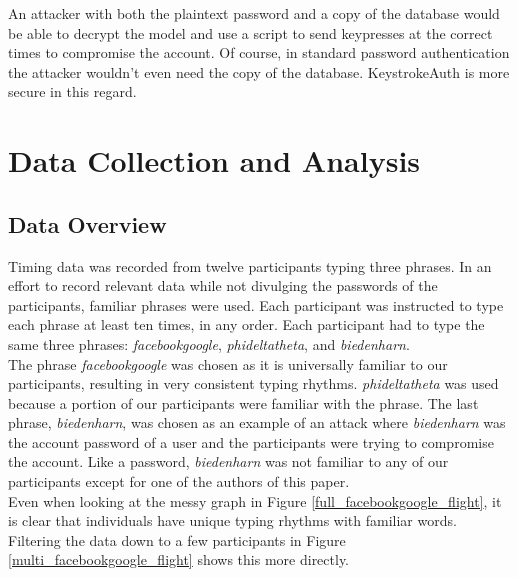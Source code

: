 \documentclass{article}
\begin{document}
An attacker with both the plaintext password and a copy of the database would be able to decrypt the model and use a script to send keypresses at the correct times to compromise the account. 
Of course, in standard password authentication the attacker wouldn't even need the copy of the database. KeystrokeAuth is more secure in this regard.



\section{Data Collection and Analysis}

\subsection{Data Overview}
Timing data was recorded from twelve participants typing three phrases. In an effort to record relevant data while not divulging the passwords of the participants, familiar phrases were used. Each participant was instructed to type each phrase at least ten times, in any order. Each participant had to type the same three phrases: \textit{facebookgoogle}, \textit{phideltatheta}, and \textit{biedenharn}.\\

The phrase \textit{facebookgoogle} was chosen as it is universally familiar to our participants, resulting in very consistent typing rhythms. \textit{phideltatheta} was used because a portion of our participants were familiar with the phrase. The last phrase, \textit{biedenharn}, was chosen as an example of an attack where \textit{biedenharn} was the account password of a user and the participants were trying to compromise the account. Like a password, \textit{biedenharn} was not familiar to any of our participants except for one of the authors of this paper.\\

Even when looking at the messy graph in Figure \ref{full_facebookgoogle_flight}, it is clear that individuals have unique typing rhythms with familiar words. Filtering the data down to a few participants in Figure \ref{multi_facebookgoogle_flight} shows this more directly.
\end{document}
